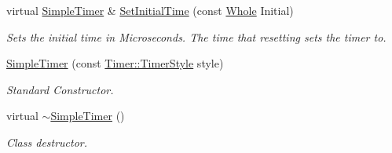 \begin{DoxyCompactItemize}
virtual \hyperlink{classphys_1_1SimpleTimer}{SimpleTimer} \& \hyperlink{classphys_1_1SimpleTimer_a00bf7f837c8ed515a65bd8dbf6d9d593}{SetInitialTime} (const \hyperlink{namespacephys_a460f6bc24c8dd347b05e0366ae34f34a}{Whole} Initial)
\begin{DoxyCompactList}\small\item\em Sets the initial time in Microseconds. The time that resetting sets the timer to. \item\end{DoxyCompactList}\item 
\hyperlink{classphys_1_1SimpleTimer_a3094be3aaf4cf65189604a413fa56f95}{SimpleTimer} (const \hyperlink{classphys_1_1Timer_a1ee86bf43e20329d750c5d582dcce329}{Timer::TimerStyle} style)
\begin{DoxyCompactList}\small\item\em Standard Constructor. \item\end{DoxyCompactList}\item 
\hypertarget{classphys_1_1SimpleTimer_ae7ef0b3d2b00b97d9c8a69654d9f6d74}{
virtual \hyperlink{classphys_1_1SimpleTimer_ae7ef0b3d2b00b97d9c8a69654d9f6d74}{$\sim$SimpleTimer} ()}
\label{classphys_1_1SimpleTimer_ae7ef0b3d2b00b97d9c8a69654d9f6d74}

\begin{DoxyCompactList}\small\item\em Class destructor. \item\end{DoxyCompactList}\end{DoxyCompactItemize}
